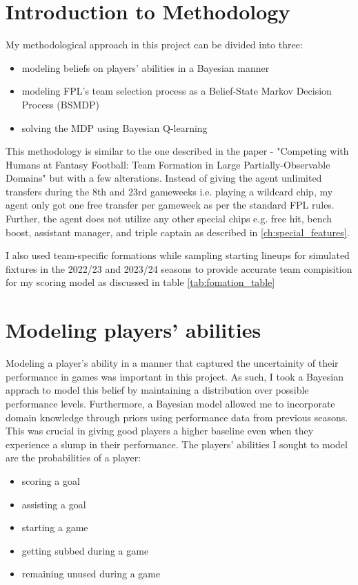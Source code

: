 \section{Introduction to Methodology}
My methodological approach in this project can be divided into three: 
\begin{itemize}
    \item modeling beliefs on players' abilities in a Bayesian manner
    \item modeling FPL's team selection process as a Belief-State Markov Decision Process (BSMDP)
    \item solving the MDP using Bayesian Q-learning
\end{itemize}
This methodology is similar to the one described in the paper - "Competing with Humans at Fantasy Football: Team Formation in Large Partially-Observable Domains" \cite{matthews2012} but with a few alterations. Instead of giving the agent unlimited transfers during the 8th and 23rd gameweeks i.e. playing a wildcard chip, my agent only got one free transfer per gameweek as per the standard FPL rules. Further, the agent does not utilize any other special chips e.g. free hit, bench boost, assistant manager, and triple captain as described in \ref{ch:special_features}.

I also used team-specific formations while sampling starting lineups for simulated fixtures in the 2022/23 and 2023/24 seasons to provide accurate team compisition for my scoring model as discussed in table \ref{tab:fomation_table} 

\section{Modeling players' abilities}
Modeling a player's ability in a manner that captured the uncertainity of their performance in games was important in this project. As such, I took a Bayesian apprach to model this belief by maintaining a distribution over possible performance levels. Furthermore, a Bayesian model allowed me to incorporate domain knowledge through priors using performance data from previous seasons. This was crucial in giving good players a higher baseline even when they experience a slump in their performance. The players' abilities I sought to model are the probabilities of a player: 
\begin{itemize}
    \item scoring a goal
    \item assisting a goal
    \item starting a game
    \item getting subbed during a game
    \item remaining unused during a game
\end{itemize}

